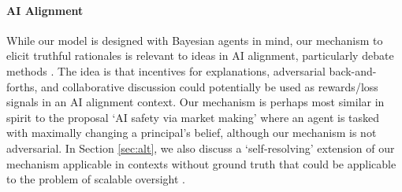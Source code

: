 \paragraph{AI Alignment}
While our model is designed with Bayesian agents in mind, our mechanism to elicit truthful rationales is relevant to ideas in AI alignment, particularly debate methods \citep{khan2024debating, michael2023debate, irving2018ai}. The idea is that incentives for explanations, adversarial back-and-forths, and collaborative discussion could potentially be used as rewards/loss signals in an AI alignment context. Our mechanism is perhaps most similar in spirit to the proposal `AI safety via market making' \citep{hubinger2020ai} where an agent is tasked with maximally changing a principal's belief, although our mechanism is not adversarial. In Section \ref{sec:alt}, we also discuss a `self-resolving' extension of our mechanism applicable in contexts without ground truth that could be applicable to the problem of scalable oversight \citep{bowman2022measuring}.


